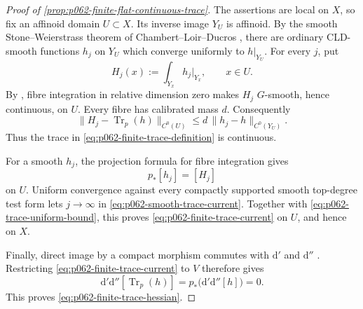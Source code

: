 
\begin{proof}[Proof of \cref{prop:p062-finite-flat-continuous-trace}]
The assertions are local on \(X\), so fix an affinoid domain \(U\subset X\).
Its inverse image \(Y_U\) is affinoid.  By the smooth
Stone--Weierstrass theorem of Chambert--Loir--Ducros
\cite[Theorem~15.2.6]{CLD25}, there are ordinary CLD-smooth functions
\(h_j\) on \(Y_U\) which converge uniformly to \(h|_{Y_U}\).
For every \(j\), put
\[
 H_j(x):=\int_{Y_x}h_j|_{Y_x},\qquad x\in U.
\]
By \cite[Theorem~16.3.3(d)]{CLD25}, fibre integration in relative
dimension zero makes \(H_j\) \(G\)-smooth, hence continuous, on \(U\).
Every fibre has
calibrated mass \(d\).  Consequently
\begin{equation}\label{eq:p062-trace-uniform-bound}
 \lVert H_j-\operatorname{Tr}_p(h)\rVert_{C^0(U)}
 \leq d\,\lVert h_j-h\rVert_{C^0(Y_U)}.
\end{equation}
Thus the trace in \eqref{eq:p062-finite-trace-definition} is continuous.

For a smooth \(h_j\), the projection formula for fibre integration
\cite[Corollary~16.5.5]{CLD25} gives
\begin{equation}\label{eq:p062-smooth-trace-current}
                         p_*[h_j]=[H_j]
\end{equation}
on \(U\).  Uniform convergence against every compactly supported smooth
top-degree test form lets \(j\to\infty\) in
\eqref{eq:p062-smooth-trace-current}.  Together with
\eqref{eq:p062-trace-uniform-bound}, this proves
\eqref{eq:p062-finite-trace-current} on \(U\), and hence on \(X\).

Finally, direct image by a compact morphism commutes with
\(\mathrm d'\) and \(\mathrm d''\)
\cite[Section~7.7.8]{CLD25}.  Restricting
\eqref{eq:p062-finite-trace-current} to \(V\) therefore gives
\[
 \mathrm d'\mathrm d''[\operatorname{Tr}_p(h)]
   =p_*\bigl(\mathrm d'\mathrm d''[h]\bigr)=0.
\]
This proves \eqref{eq:p062-finite-trace-hessian}.
\end{proof}

